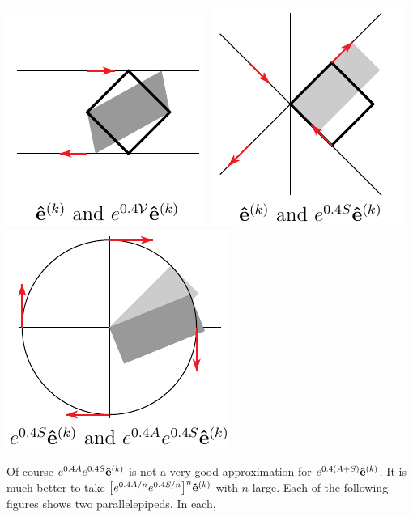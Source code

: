 \begin{eg}[$\ \vv(x,y)= 2y\hi.$]
\begin{wfig}
\begin{center}
    \includegraphics{square3.pdf}\qquad
    \includegraphics{square4.pdf}\qquad
    \includegraphics{square5.pdf}
\end{center}
\end{wfig}
Of course $e^{0.4A}e^{0.4S}\mathbf{\hat e}^{(k)}$ is not a very good approximation
for $e^{0.4(A+S)}\mathbf{\hat e}^{(k)}$. It is much better to take
$\big[e^{0.4A/n}e^{0.4S/n}\big]^{n}\mathbf{\hat e}^{(k)}$ with $n$ large. 
Each of the following figures shows two parallelepipeds. In each,

\end{eg}
